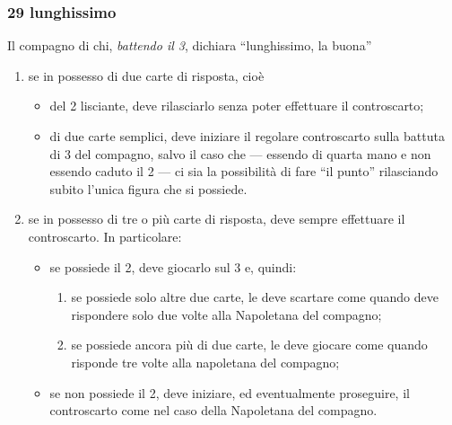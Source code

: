 \documentclass[italian,a4paper]{article}
\newenvironment{packeditem}{
\begin{itemize}
  \setlength{\itemsep}{1pt}
  \setlength{\parskip}{0pt}
  \setlength{\parsep}{0pt}
}{\end{itemize}}
\newenvironment{packedenum}{
\begin{enumerate}
  \setlength{\itemsep}{1pt}
  \setlength{\parskip}{0pt}
  \setlength{\parsep}{0pt}
}{\end{enumerate}}
\begin{document}
\subsubsection{29 lunghissimo}
Il compagno di chi, \emph{battendo il 3}, dichiara ``lunghissimo, la buona''
\begin{packedenum}
    \item se in possesso di due carte di risposta, cioè
        \begin{packeditem}
            \item  del 2 lisciante, deve rilasciarlo senza poter effettuare il controscarto;
            \item  di due carte semplici, deve iniziare il
                regolare controscarto sulla battuta di 3 del
                compagno, salvo il caso che --- essendo di
                quarta mano e non essendo caduto il 2 --- ci sia la possibilità di fare ``il  punto'' rilasciando subito l'unica figura che si possiede.
        \end{packeditem}
    \item se in possesso di tre o più carte di risposta, deve sempre effettuare il controscarto. In particolare:
        \begin{packeditem}
            \item   se possiede il 2, deve giocarlo sul 3 e, quindi:
                \begin{packedenum}
                    \item   se possiede solo altre due carte, le deve scartare come quando deve rispondere solo due volte alla Napoletana del compagno;
                    \item se possiede ancora più di due carte, le deve giocare come quando risponde tre volte alla napoletana del compagno;
                \end{packedenum}
            \item  se non possiede il 2, deve iniziare, ed eventualmente proseguire, il controscarto come nel caso della Napoletana del compagno.
        \end{packeditem}
\end{packedenum}
\end{document}
